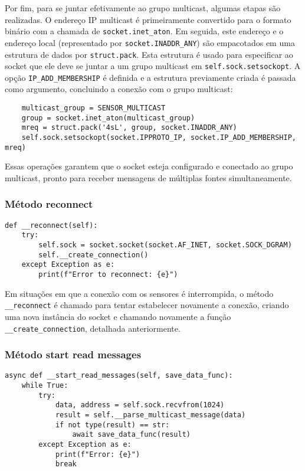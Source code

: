 Por fim, para se juntar efetivamente ao grupo multicast, algumas etapas são realizadas. O endereço IP multicast é primeiramente convertido para o formato binário com a chamada de \texttt{socket.inet\_aton}. Em seguida, este endereço e o endereço local (representado por \texttt{socket.INADDR\_ANY}) são empacotados em uma estrutura de dados por \texttt{struct.pack}. Esta estrutura é usado para especificar ao socket que ele deve se juntar a um grupo multicast em \texttt{self.sock.setsockopt}. A opção \texttt{IP\_ADD\_MEMBERSHIP} é definida e a estrutura previamente criada é passada como argumento, concluindo a conexão com o grupo multicast:

\begin{verbatim}
    multicast_group = SENSOR_MULTICAST
    group = socket.inet_aton(multicast_group)
    mreq = struct.pack('4sL', group, socket.INADDR_ANY)
    self.sock.setsockopt(socket.IPPROTO_IP, socket.IP_ADD_MEMBERSHIP, mreq)
\end{verbatim}

Essas operações garantem que o socket esteja configurado e conectado ao grupo multicast, pronto para receber mensagens de múltiplas fontes simultaneamente.


\subsubsection[Método reconnect]{Método reconnect}
\begin{verbatim}
def __reconnect(self):
    try:
        self.sock = socket.socket(socket.AF_INET, socket.SOCK_DGRAM)
        self.__create_connection()
    except Exception as e:
        print(f"Error to reconnect: {e}")
\end{verbatim}

Em situações em que a conexão com os sensores é interrompida, o método \texttt{\_\_reconnect} é chamado para tentar estabelecer novamente a conexão, criando uma nova instância do socket e chamando novamente a função \texttt{\_\_create\_connection}, detalhada anteriormente.

\subsubsection[Método start read messages]{Método start read messages}

\begin{verbatim}
async def __start_read_messages(self, save_data_func):
    while True:
        try:
            data, address = self.sock.recvfrom(1024)
            result = self.__parse_multicast_message(data)
            if not type(result) == str:
                await save_data_func(result)
        except Exception as e:
            print(f"Error: {e}")
            break
\end{verbatim}

